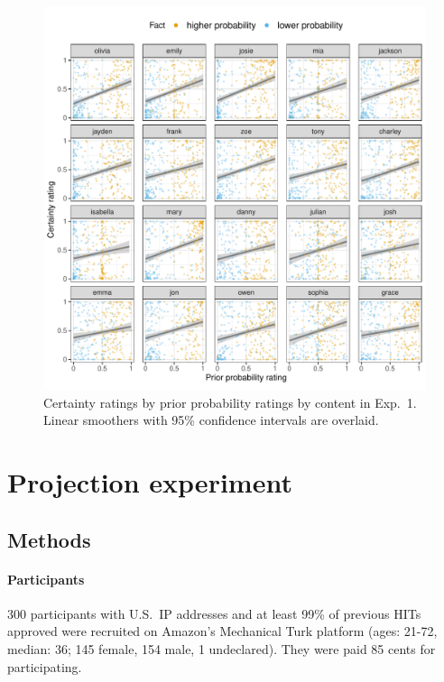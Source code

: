 \documentclass[11pt,fleqn]{article}
\newcommand{\6}{\mbox{$[\hspace*{-.6mm}[$}}
\newcommand{\9}{\mbox{$]\hspace*{-.6mm}]$}}
\begin{document}
\begin{figure}[h!]
\centering

\includegraphics[width=.7\paperwidth]{../../results/exp4/graphs/projection-by-prior-by-content}

\caption{Certainty ratings by prior probability ratings by content in Exp.~1. Linear smoothers with 95\% confidence intervals are overlaid.}
\label{f-influence-by-content}
\end{figure}

\section{Projection experiment}\label{a-proj}

\subsection{Methods}

\paragraph{Participants} 300 participants with U.S.\ IP addresses and at least 99\% of previous HITs approved were recruited on Amazon's Mechanical Turk platform (ages: 21-72, median: 36; 145 female, 154 male, 1 undeclared). They were paid 85 cents for participating. 
\end{document}
